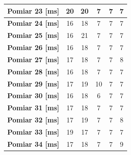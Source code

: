 \documentclass[11pt,a4paper]{article}
\begin{document}
\begin{table}[htbp]
\begin{center}
\begin{tabular}{|c|c|c|c|c|c|}
\textbf{Pomiar 23 [ms]} & 20 & 20 & 7 & 7 & 7 \\ \hline
\textbf{Pomiar 24 [ms]} & 16 & 18 & 7 & 7 & 7 \\ \hline
\textbf{Pomiar 25 [ms]} & 16 & 21 & 7 & 7 & 7 \\ \hline
\textbf{Pomiar 26 [ms]} & 16 & 18 & 7 & 7 & 7 \\ \hline
\textbf{Pomiar 27 [ms]} & 17 & 18 & 7 & 7 & 8 \\ \hline
\textbf{Pomiar 28 [ms]} & 16 & 18 & 7 & 7 & 7 \\ \hline
\textbf{Pomiar 29 [ms]} & 17 & 19 & 10 & 7 & 7 \\ \hline
\textbf{Pomiar 30 [ms]} & 16 & 18 & 6 & 7 & 7 \\ \hline
\textbf{Pomiar 31 [ms]} & 17 & 18 & 7 & 7 & 7 \\ \hline
\textbf{Pomiar 32 [ms]} & 17 & 19 & 7 & 7 & 8 \\ \hline
\textbf{Pomiar 33 [ms]} & 19 & 17 & 7 & 7 & 7 \\ \hline
\textbf{Pomiar 34 [ms]} & 17 & 18 & 7 & 7 & 9 \\ \hline
\end{tabular}
\end{center}
\label{Wyniki1}
\end{table}

\newpage
\end{document}
